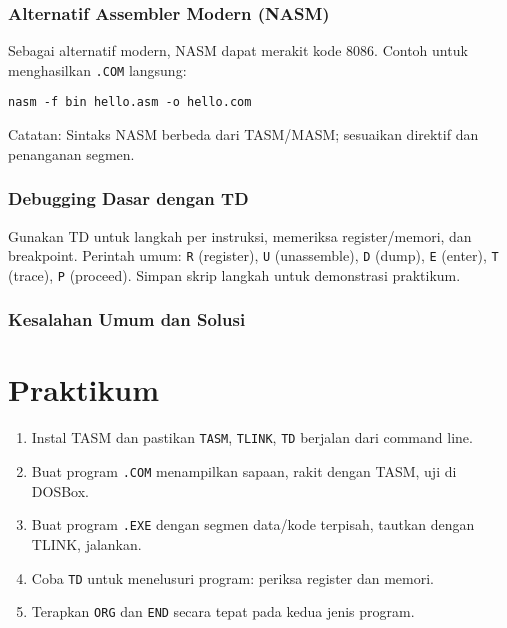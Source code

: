 \subsubsection{Alternatif Assembler Modern (NASM)}
Sebagai alternatif modern, NASM dapat merakit kode 8086. Contoh untuk menghasilkan \texttt{.COM} langsung: \cite{nasm_manual}
\begin{verbatim}
nasm -f bin hello.asm -o hello.com
\end{verbatim}
Catatan: Sintaks NASM berbeda dari TASM/MASM; sesuaikan direktif dan penanganan segmen.

\subsubsection{Debugging Dasar dengan TD}
Gunakan TD untuk langkah per instruksi, memeriksa register/memori, dan breakpoint. Perintah umum: \texttt{R} (register), \texttt{U} (unassemble), \texttt{D} (dump), \texttt{E} (enter), \texttt{T} (trace), \texttt{P} (proceed). Simpan skrip langkah untuk demonstrasi praktikum. \cite{borland1990tasm}

\subsubsection{Kesalahan Umum dan Solusi}

\section{Praktikum}
\begin{enumerate}
  \item Instal TASM dan pastikan \texttt{TASM}, \texttt{TLINK}, \texttt{TD} berjalan dari command line.
  \item Buat program \texttt{.COM} menampilkan sapaan, rakit dengan TASM, uji di DOSBox.
  \item Buat program \texttt{.EXE} dengan segmen data/kode terpisah, tautkan dengan TLINK, jalankan.
  \item Coba \texttt{TD} untuk menelusuri program: periksa register dan memori.
  \item Terapkan \texttt{ORG} dan \texttt{END} secara tepat pada kedua jenis program.
\end{enumerate}

